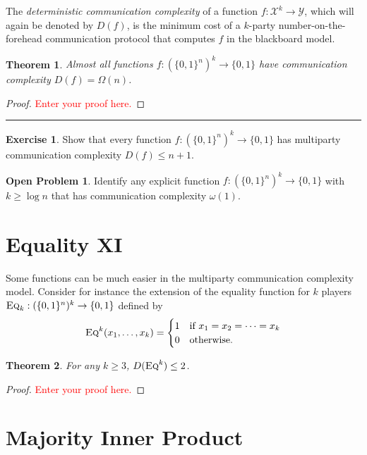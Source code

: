 \documentclass[11pt]{amsart}
\theoremstyle{plain}
\newtheorem{theorem}{Theorem}
\theoremstyle{definition}
\newtheorem{exercise}{Exercise}
\newtheorem{open}{Open Problem}
\theoremstyle{plain}
\newcommand{\calX}{\mathcal{X}}
\newcommand{\calY}{\mathcal{Y}}
\newcommand{\Eq}{\textsc{Eq}}
\newcommand{\exercises}{\bigskip \noindent\rule{8cm}{0.4pt} \medskip}
\newcommand{\replacethistext}[1]{\textcolor{red}{#1}}
\begin{document}
The \emph{deterministic communication complexity} of a function $f : \calX^k \to \calY$, which will again be denoted by $D(f)$, is the minimum cost of a $k$-party number-on-the-forehead communication protocol that computes $f$ in the blackboard model.

\begin{theorem}
Almost all functions $f : (\{0,1\}^{n})^k \to \{0,1\}$ have communication complexity $D(f) = \Omega(n)$.
\end{theorem}

\begin{proof}
\replacethistext{Enter your proof here.}
\end{proof}

\exercises

\begin{exercise}
Show that every function $f : (\{0,1\}^{n})^k \to \{0,1\}$ has multiparty communication complexity $D(f) \le n+1$.
\end{exercise}

\begin{open}
Identify any explicit function $f : (\{0,1\}^{n})^k \to \{0,1\}$ with $k \ge \log n$ that has communication complexity $\omega(1)$.
\end{open}


\newpage 
\section{Equality XI}

Some functions can be much easier in the multiparty communication complexity model. Consider for instance the extension of the equality function for $k$ players $\Eq_k : (\{0,1\}^n)^k \to \{0,1\}$ defined by
\[
\Eq^k(x_1,\ldots,x_k) = \begin{cases}
1 & \mbox{if } x_1 = x_2 = \cdots = x_k \\
0 & \mbox{otherwise.}
\end{cases}
\]
\begin{theorem}
For any $k \ge 3$, $D(\Eq^k) \le 2$.
\end{theorem}

\begin{proof}
\replacethistext{Enter your proof here.}
\end{proof}



\newpage 
\section{Majority Inner Product}
\end{document}
